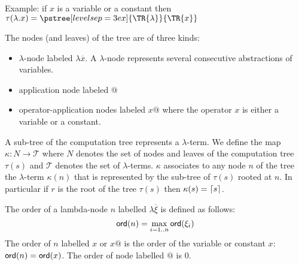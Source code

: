 Example: if $x$ is a variable or a constant then
$ \cmptre{\lambda . x} =
  \pstree[levelsep=3ex]
    { \TR{\lambda } }
    { \TR{x}
    }$

The nodes (and leaves) of the tree are of three kinds:
\begin{itemize}
\item $\lambda$-node labeled $\lambda \overline{x}$. A $\lambda$-node represents several consecutive abstractions of variables.
\item application node labeled $@$
\item operator-application nodes labeled $x @$ where the operator $x$ is
either a variable or a constant.
\end{itemize}

A sub-tree of the computation tree represents a $\lambda$-term. We
define the map $\kappa : N \rightarrow \mathcal{T}$ where $N$
denotes the set of nodes and leaves of the computation tree
$\tau(s)$ and $\mathcal{T}$ denotes the set of $\lambda$-terms.
$\kappa$ associates to any node $n$ of the tree the $\lambda$-term
$\kappa(n)$ that is represented by the sub-tree of $\tau(s)$ rooted
at $n$. In particular if $r$ is the root of the tree $\tau(s)$ then
$\kappa(s) = \lceil s\rceil$.

\begin{dfn}
The order of a lambda-node $n$ labelled $\lambda \overline{\xi}$ is defined as follows:
$${\sf ord}(n) = \max_{i=1..n} {\sf ord}(\xi_i)$$
The order of $n$ labelled $x$ or $x@$ is the order of the variable or constant $x$:
${\sf ord}(n) = {\sf ord}(x)$.
The order of node labelled $@$ is $0$.
\end{dfn}


